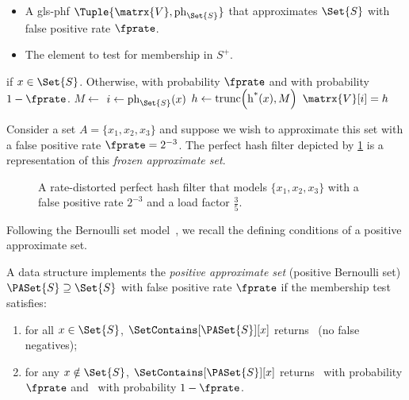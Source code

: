 \documentclass[ ../main.tex]{subfiles}
\begin{document}
\begin{algorithm}[h]
    \caption{Membership test for the \gls{gls-phf}}
    \label{alg:PHF_has}
    \KwIn
    {
        \begin{itemize}
            \item[$S^{+}$] A \gls{gls-phf} $\Tuple{\matrx{V}, \ph_{\Set{S}}}$ that approximates $\Set{S}$ with false positive rate $\fprate$.
            \item[$x$] The element to test for membership in $S^{+}$.
        \end{itemize}
    }
    \KwOut
    {
        \True if $x \in \Set{S}$. Otherwise, \True with probability $\fprate$ and \False with probability $1 - \fprate$.
    }
    {
        $M \gets$ \;
        $i \gets \ph_{\Set{S}}(x)$\;
        $h \gets \operatorname{trunc}\!\left(\operatorname{h^*}(x), M\right)$\;
        \Return $\matrx{V}[i] = h$\;
    }
\end{algorithm}

\begin{example}
Consider a set $A = \{x_1, x_2, x_3\}$ and suppose we wish to approximate this set with a false positive rate $\fprate = 2^{-3}$. The perfect hash filter depicted by \cref{fig:PHFilter} is a representation of this \emph{frozen approximate set}.
\end{example}
\begin{figure}
\caption[Perfect hash filter]{A rate-distorted perfect hash filter that models  $\{x_1,x_2,x_3\}$ with a false positive rate $2^{-3}$ and a load factor $\frac{3}{5}$.}
\label{fig:PHFilter}
\centering

\end{figure}

Following the Bernoulli set model~\cite{bsets}, we recall the defining conditions of a positive approximate set.
\begin{definition}
\label{def:approx_set}
A data structure implements the \emph{positive approximate set} (positive Bernoulli set) $\PASet{S} \supseteq \Set{S}$ with false positive rate $\fprate$ if the membership test satisfies:
\begin{enumerate}
\item for all $x \in \Set{S}$, $\SetContains[\PASet{S}][x]$ returns \True\ (no false negatives);
\item for any $x \notin \Set{S}$, $\SetContains[\PASet{S}][x]$ returns \True\ with probability $\fprate$ and \False\ with probability $1 - \fprate$.
\end{enumerate}
\end{definition}
\end{document}
